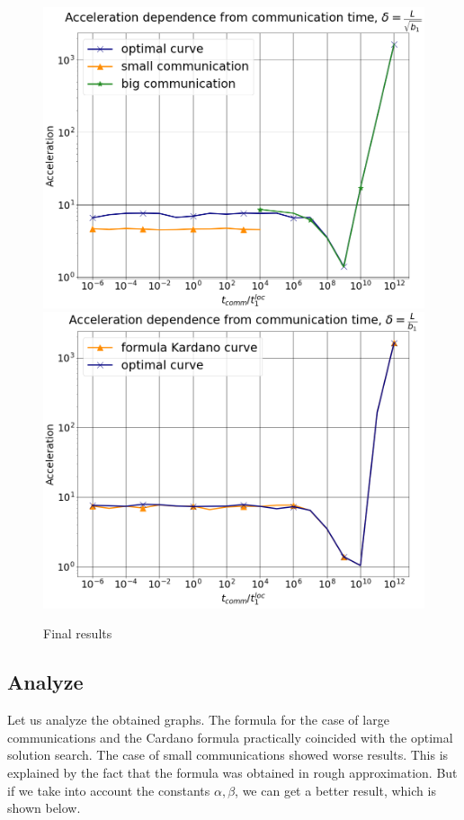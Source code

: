\documentclass{article}
\begin{document}
\begin{figure}[!ht]
    {\includegraphics[scale = 0.21]{final_graph1.png}}
    {\includegraphics[scale = 0.21]{final_graph2.png}}
    \caption{Final results}
    \label{ris:image}
\end{figure}



\subsection{Analyze}
Let us analyze the obtained graphs. The formula for the case of large communications and the Cardano formula practically coincided with the optimal solution search. The case of small communications showed worse results. This is explained by the fact that the formula was obtained in rough approximation. But if we take into account the constants $\alpha, \beta$, we can get a better result, which is shown below.
\end{document}
